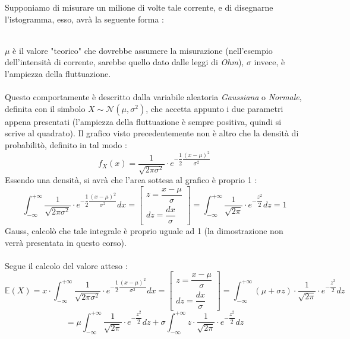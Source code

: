 \documentclass[12pt, letterpaper]{article}
\newcommand{\E}{{\mathbb E}}
\newcommand{\acc}{\\\hphantom{}\\}
\begin{document}
Supponiamo di misurare un milione di volte tale corrente, e di disegnarne 
l'istogramma, esso, avrà la seguente forma : \begin{figure}[h]
\end{figure}
\\\(\mu\) è il valore "teorico" che dovrebbe assumere la misurazione (nell'esempio dell'intensità di corrente, 
sarebbe quello dato dalle leggi di \textit{Ohm}), \(\sigma\) invece, è l'ampiezza della fluttuazione.\acc 
Questo comportamente è descritto dalla variabile aleatoria \textit{Gaussiana} o \textit{Normale}, definita 
con il simbolo \(X\sim \mathcal{N}(\mu,\sigma^2)\), che accetta appunto i due parametri appena presentati (l'ampiezza della 
fluttuazione è sempre positiva, quindi si scrive al quadrato).
Il grafico visto precedentemente non è altro che la densità di probabilitò, definito in tal modo : 
$$f_X(x)=\dfrac{1}{\sqrt{2\pi\sigma^2}}\cdot e^{-\dfrac{1}{2}\dfrac{(x-\mu)^2}{\sigma^2}}$$
Essendo una densità, si avrà che l'area sottesa al grafico è proprio 1 : 
\begin{equation}
    \int_{-\infty}^{+\infty}\dfrac{1}{\sqrt{2\pi\sigma^2}}\cdot e^{-\dfrac{1}{2}\dfrac{(x-\mu)^2}{\sigma^2}}dx 
    =\begin{bmatrix}
        z=\dfrac{x-\mu}{\sigma}\\ dz=\dfrac{dx}{\sigma}
    \end{bmatrix}=
    \int_{-\infty}^{+\infty}\dfrac{1}{\sqrt{2\pi}}\cdot e^{-\dfrac{z^2}{2}}dz=1
\end{equation}
Gauss, calcolò che tale integrale è proprio uguale ad 1 (la dimostrazione non verrà presentata
 in questo corso).\acc 
 Segue il calcolo del valore atteso : \begin{equation}
    \E(X)=x\cdot\int_{-\infty}^{+\infty}\dfrac{1}{\sqrt{2\pi\sigma^2}}\cdot e^{-\dfrac{1}{2}\dfrac{(x-\mu)^2}{\sigma^2}}dx
    =\begin{bmatrix}
        z=\dfrac{x-\mu}{\sigma}\\ dz=\dfrac{dx}{\sigma}
    \end{bmatrix}=
    \int_{-\infty}^{+\infty}(\mu+\sigma z)\cdot \dfrac{1}{\sqrt{2\pi}}\cdot e^{-\dfrac{z^2}{2}}dz
\end{equation}\begin{equation}
    =\mu\int_{-\infty}^{+\infty}\dfrac{1}{\sqrt{2\pi}}\cdot e^{-\dfrac{z^2}{2}}dz+
    \sigma \int_{-\infty}^{+\infty}z\cdot \dfrac{1}{\sqrt{2\pi}}\cdot e^{-\dfrac{z^2}{2}}dz
\end{equation}
\end{document}
